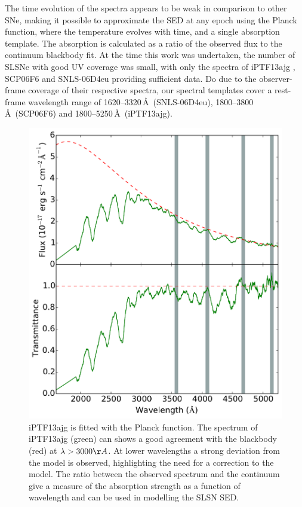 The time evolution of the spectra appears to be weak in comparison to other SNe, making it possible to approximate the SED at any epoch using the Planck function, where the temperature evolves with time, and a single absorption template. The absorption is calculated as a ratio of the observed flux to the continuum blackbody fit. At the time this work was undertaken, the number of SLSNe with good UV coverage was small, with only the spectra of iPTF13ajg \citep{2014ApJ...797...24V}, SCP06F6 \citep{2009ApJ...690.1358B} and SNLS-06D4eu \citep{2013ApJ...779...98H} providing sufficient data. Do due to the observer-frame coverage of their respective spectra, our spectral templates cover a rest-frame wavelength range of 1620--3320\,\AA\ (SNLS-06D4eu), 1800--3800\,\AA\ (SCP06F6) and 1800--5250\,\AA\ (iPTF13ajg).
\begin{figure}
\centering
\includegraphics[width=\textwidth]{Figures/Chapter4/specTemplate}
\caption{iPTF13ajg is fitted with the Planck function. The spectrum of iPTF13ajg (green) can shows a good agreement with the blackbody (red) at $\lambda>3000\AA$. At lower wavelengths a strong deviation from the model is observed, highlighting the need for a correction to the model. The ratio between the observed spectrum and the continuum give a measure of the absorption strength as a function of wavelength and can be used in modelling the SLSN SED.}
\label{fig:specTemplate}
\end{figure}


